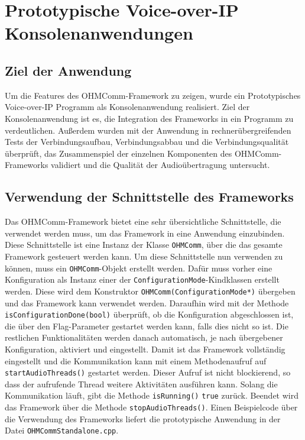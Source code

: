 \chapter{Prototypische Voice-over-IP Konsolenanwendungen}
\label{prototypProgram}
\section{Ziel der Anwendung}

Um die Features des OHMComm-Framework zu zeigen, wurde ein Prototypisches Voice-over-IP Programm als Konsolenanwendung realisiert. Ziel der Konsolenanwendung ist es, die Integration des Frameworks in ein Programm zu verdeutlichen. Außerdem wurden mit der Anwendung in rechnerübergreifenden Tests der Verbindungsaufbau, Verbindungsabbau und die Verbindungsqualität überprüft, das Zusammenspiel der einzelnen Komponenten des OHMComm-Frameworks validiert und die Qualität der Audioübertragung untersucht. 

\section{Verwendung der Schnittstelle des Frameworks}
Das OHMComm-Framework bietet eine sehr übersichtliche Schnittstelle, die verwendet werden muss, um das Framework in eine Anwendung einzubinden. Diese Schnittstelle ist eine Instanz der Klasse \texttt{OHMComm}, über die das gesamte Framework gesteuert werden kann. Um diese Schnittstelle nun verwenden zu können, muss ein \texttt{OHMComm}-Objekt erstellt werden. Dafür muss vorher eine Konfiguration als Instanz einer der \texttt{ConfigurationMode}-Kindklassen erstellt werden. Diese wird dem Konstruktor \texttt{OHMComm(ConfigurationMode*)} übergeben und das Framework kann verwendet werden. Daraufhin wird mit der Methode \texttt{isConfigurationDone\allowbreak{}(bool)} überprüft, ob die Konfiguration abgeschlossen ist, die über den Flag-Parameter gestartet werden kann, falls dies nicht so ist. Die restlichen Funktionalitäten werden danach automatisch, je nach übergebener Konfiguration, aktiviert und eingestellt. Damit ist das Framework vollständig eingestellt und die Kommunikation kann mit einem Methodenaufruf auf \texttt{startAudioThreads()} gestartet werden. Dieser Aufruf ist nicht blockierend, so dass der aufrufende Thread weitere Aktivitäten ausführen kann. Solang die Kommunikation läuft, gibt die Methode \texttt{isRunning()} \texttt{true} zurück. Beendet wird das Framework über die Methode \texttt{stopAudioThreads()}. Einen Beispielcode über die Verwendung des Frameworks liefert die prototypische Anwendung in der Datei \texttt{OHMCommStandalone.cpp}.
